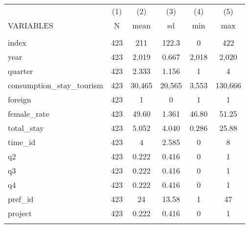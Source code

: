 \documentclass[]{article}
\begin{document}
\begin{tabular}{lccccc} \hline
 & (1) & (2) & (3) & (4) & (5) \\
VARIABLES & N & mean & sd & min & max \\ \hline
 &  &  &  &  &  \\
index & 423 & 211 & 122.3 & 0 & 422 \\
year & 423 & 2,019 & 0.667 & 2,018 & 2,020 \\
quarter & 423 & 2.333 & 1.156 & 1 & 4 \\
consumption\_stay\_tourism & 423 & 30,465 & 20,565 & 3,553 & 130,666 \\
foreign & 423 & 1 & 0 & 1 & 1 \\
female\_rate & 423 & 49.60 & 1.361 & 46.80 & 51.25 \\
total\_stay & 423 & 5.052 & 4.040 & 0.286 & 25.88 \\
time\_id & 423 & 4 & 2.585 & 0 & 8 \\
q2 & 423 & 0.222 & 0.416 & 0 & 1 \\
q3 & 423 & 0.222 & 0.416 & 0 & 1 \\
q4 & 423 & 0.222 & 0.416 & 0 & 1 \\
pref\_id & 423 & 24 & 13.58 & 1 & 47 \\
project & 423 & 0.222 & 0.416 & 0 & 1 \\
 &  &  &  &  &  \\ \hline
\end{tabular}
\end{document}
